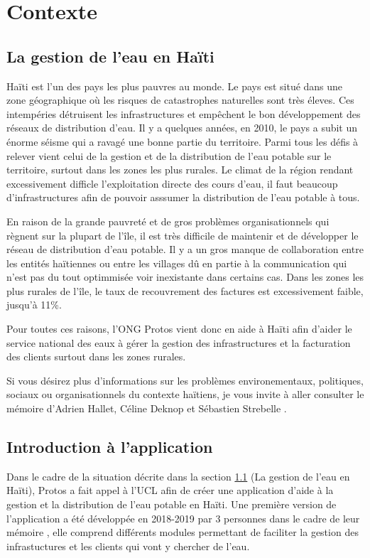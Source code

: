 \documentclass{EPL-master-thesis-covers-FR}
\begin{document}

	\chapter{Contexte}


		\section{La gestion de l'eau en Haïti}
			\label{sec:situation}
			
				Haïti est l'un des pays les plus pauvres au monde. Le pays est situé dans une zone géographique où les risques de catastrophes naturelles sont très éleves. Ces intempéries détruisent les infrastructures et empêchent le bon développement des réseaux de distribution d'eau. Il y a quelques années, en 2010, le pays a subit un énorme séisme qui a ravagé une bonne partie du territoire. Parmi tous les défis à relever vient celui de la gestion et de la distribution de l'eau potable sur le territoire, surtout dans les zones les plus rurales. Le climat de la région rendant excessivement difficle l'exploitation directe des cours d'eau, il faut beaucoup d'infrastructures afin de pouvoir asssumer la distribution de l'eau potable à tous.
				
				En raison de la grande pauvreté et de gros problèmes organisationnels qui règnent sur la plupart de l'île, il est très difficile de maintenir et de développer le réseau de distribution d'eau potable. Il y a un gros manque de collaboration entre les entités haïtiennes ou entre les villages dû en partie à la communication qui n'est pas du tout optimmisée voir inexistante dans certains cas. Dans les zones les plus rurales de l'île, le taux de recouvrement des factures est excessivement faible, jusqu'à 11\%.
				
				Pour toutes ces raisons, l'ONG Protos vient donc en aide à Haïti afin d'aider le service national des eaux à gérer la gestion des infrastructures et la facturation des clients surtout dans les zones rurales.
				
				Si vous désirez plus d'informations sur les problèmes environementaux, politiques, sociaux ou organisationnels du contexte haïtiens, je vous invite à aller consulter le mémoire d'Adrien Hallet, Céline Deknop et Sébastien Strebelle \cite{ref:haitiwater}.



		\section{Introduction à l'application}
				Dans le cadre de la situation décrite dans la section \ref{sec:situation} (La gestion de l'eau en Haïti), Protos a fait appel à l'UCL afin de créer une application d'aide à la gestion et la distribution de l'eau potable en Haïti. Une première version de l'application a été développée en 2018-2019 par 3 personnes dans le cadre de leur mémoire \cite{ref:haitiwater}, elle comprend différents modules permettant de faciliter la gestion des infrastuctures et les clients qui vont y chercher de l'eau.
				
\end{document}
